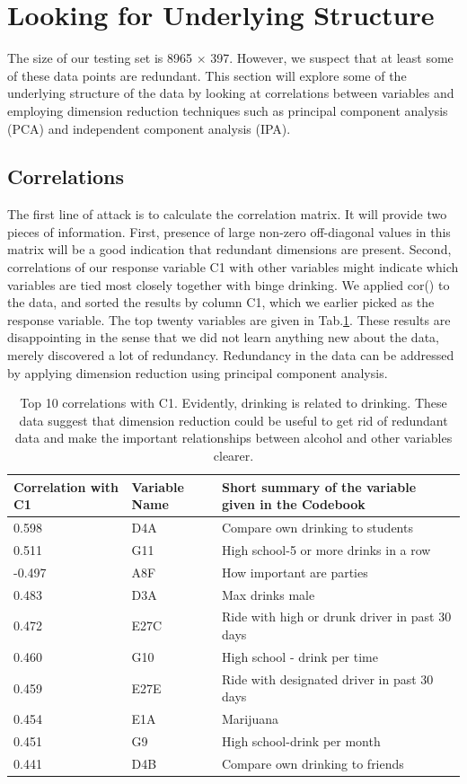 \section{Looking for Underlying Structure}
\label{sec:PCA}
The size of our testing set is 8965 $\times$ 397. However, we suspect that at least some of these data points are redundant. This section will explore some of the underlying structure of the data by looking at correlations between variables and employing dimension reduction techniques such as principal component analysis (PCA) and independent component analysis (IPA). 
\subsection{Correlations}
The first line of attack is to calculate the correlation matrix. It will provide two pieces of information. First, presence of large non-zero off-diagonal values in this matrix will be a good indication that redundant dimensions are present. Second, correlations of our response variable C1 with other variables might indicate which variables are tied most closely together with binge drinking. We applied cor() to the data, and sorted the results by column C1, which we earlier picked as the response variable. The top twenty variables are given in Tab.\ref{correlations}. These results are disappointing in the sense that we did not learn anything new about the data, merely discovered a lot of redundancy. Redundancy in the data can be addressed by applying dimension reduction using principal component analysis.

\begin{center}
\begin{table}[ht]
\begin{tabular}{l l l}
\hline \hline
Correlation with C1 & Variable Name &Short summary of the variable given in the Codebook\\ \hline 
0.598 & D4A	&Compare own drinking to students\\
0.511 & G11	&High school-5 or more drinks in a row\\
-0.497 & A8F	&How important are parties\\
0.483 & D3A	&Max drinks male\\
0.472 & E27C	&Ride with high or drunk driver in past 30 days\\
0.460 & G10	&High school - drink per time\\
0.459 & E27E	&Ride with designated driver in past 30 days\\
0.454 & E1A	&Marijuana\\
0.451 & G9	&High school-drink per month\\
0.441 & D4B	&Compare own drinking to friends\\
\hline
\end{tabular}
\caption{Top 10 correlations with C1. Evidently, drinking is related to drinking. These data suggest that dimension reduction could be useful to get rid of redundant data and make the important relationships between alcohol and other variables clearer.}
\label{correlations}
\end{table}
\end{center}

